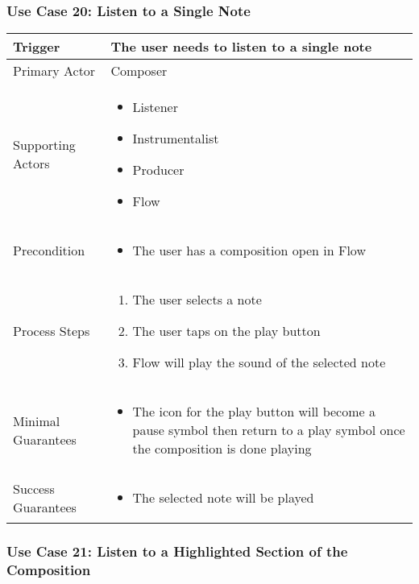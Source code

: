 \subsubsection{Use Case 20: Listen to a Single Note}

\begin{tabularx}{\textwidth}{|X|X|}
\hline
Trigger & 
The user needs to listen to a single note \\
\hline
Primary Actor & 
Composer \\
\hline
Supporting Actors & 
\begin{itemize}
\item Listener
\item Instrumentalist
\item Producer
\item Flow
\end{itemize} \\
\hline
Precondition & 
\begin{itemize}
\item The user has a composition open in Flow
\end{itemize} \\
\hline
Process Steps & 
\begin{enumerate}
\item The user selects a note
\item The user taps on the play button
\item Flow will play the sound of the selected note
\end{enumerate} \\
\hline
Minimal Guarantees & 
\begin{itemize}
 \item The icon for the play button will become a pause symbol then return to a play symbol once the composition is done playing
\end{itemize} \\
\hline
Success Guarantees & 
\begin{itemize}
  \item The selected note will be played
\end{itemize} \\
\hline
\end{tabularx}

\subsubsection{Use Case 21: Listen to a Highlighted Section of the Composition}


